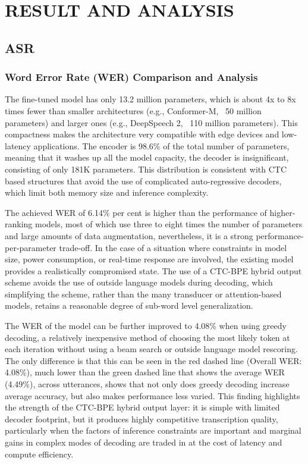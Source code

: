 \newpage
\section{\MakeUppercase{Result and Analysis}}
	
\subsection{ASR}
\subsubsection{Word Error Rate (WER) Comparison and Analysis}
The fine-tuned model has only 13.2 million parameters, which is about 4x to 8x times fewer than smaller architectures (e.g., Conformer-M, ~50 million parameters) and larger ones (e.g., DeepSpeech 2, ~110 million parameters). This compactness makes the architecture very compatible with edge devices and low-latency applications. The encoder is 98.6\% of the total number of parameters, meaning that it washes up all the model capacity, the decoder is insignificant, consisting of only 181K  parameters. This distribution is consistent with CTC based structures that avoid the use of complicated auto-regressive decoders, which limit both memory size and inference complexity.

The achieved WER of 6.14\% per cent is higher than the performance of higher-ranking models, most of which use three to eight times the number of parameters and large amounts of data augmentation, nevertheless, it is a strong performance-per-parameter trade-off. In the case of a situation where constraints in model size, power consumption, or real-time response are involved, the existing model provides a realistically compromised state. The use of a CTC-BPE hybrid output scheme avoids the use of outside language models during decoding, which simplifying the scheme, rather than the many transducer or attention-based models, retains a reasonable degree of sub-word level generalization.

The WER of the model can be further improved to 4.08\% when using greedy decoding, a relatively inexpensive method of choosing the most likely token at each iteration without using a beam search or outside language model rescoring. The only difference is that this can be seen in the red dashed line (Overall WER: 4.08\%), much lower than the green dashed line that shows the average WER (4.49\%), across utterances, shows that not only does greedy decoding increase average accuracy, but also makes performance less varied. This finding highlights the strength of the CTC-BPE hybrid output layer: it is simple with limited decoder footprint, but it produces highly competitive transcription quality, particularly when the factors of inference constraints are important and marginal gains in complex modes of decoding are traded in at the cost of latency and compute efficiency.


